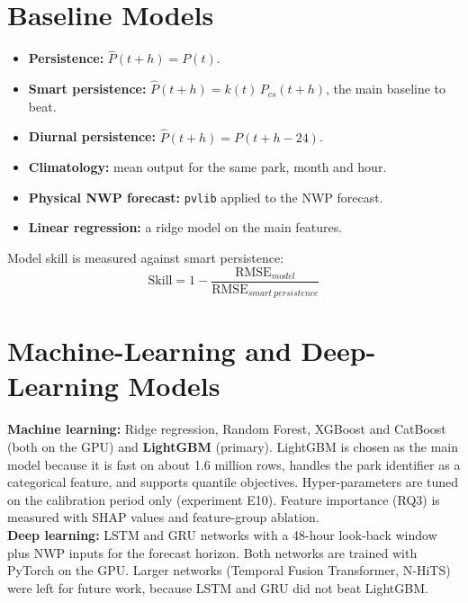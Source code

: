 \documentclass[12pt]{report}
\begin{document}
\section{Baseline Models}
\vspace{1mm}
\begin{itemize}[noitemsep]
    \item \textbf{Persistence:} $\hat{P}(t+h) = P(t)$.
    \item \textbf{Smart persistence:} $\hat{P}(t+h) = k(t)\,P_{cs}(t+h)$, the main baseline to beat.
    \item \textbf{Diurnal persistence:} $\hat{P}(t+h) = P(t+h-24)$.
    \item \textbf{Climatology:} mean output for the same park, month and hour.
    \item \textbf{Physical NWP forecast:} \texttt{pvlib} applied to the NWP forecast.
    \item \textbf{Linear regression:} a ridge model on the main features.
\end{itemize}
Model skill is measured against smart persistence:
\begin{equation}
    \text{Skill} = 1 - \frac{\text{RMSE}_{model}}{\text{RMSE}_{smart\ persistence}}
\end{equation}

\section{Machine-Learning and Deep-Learning Models}
\vspace{1mm}
\textbf{Machine learning:} Ridge regression, Random Forest, XGBoost \cite{xgboost} and CatBoost \cite{catboost} (both on the GPU) and \textbf{LightGBM} (primary). LightGBM is chosen as the main model because it is fast on about 1.6 million rows, handles the park identifier as a categorical feature, and supports quantile objectives. Hyper-parameters are tuned on the calibration period only (experiment E10). Feature importance (RQ3) is measured with SHAP values \cite{shap} and feature-group ablation.\\

\textbf{Deep learning:} LSTM and GRU networks with a 48-hour look-back window plus NWP inputs for the forecast horizon. Both networks are trained with PyTorch on the GPU. Larger networks (Temporal Fusion Transformer, N-HiTS) were left for future work, because LSTM and GRU did not beat LightGBM.
\end{document}
